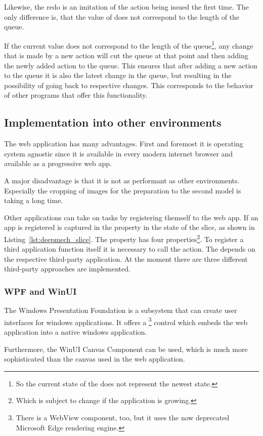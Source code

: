 Likewise, the redo is an imitation of the action being issued the first time.
The only difference is, that the value of  does not correspond to the length of the queue.

If the current  value does not correspond to the length of the queue\footnote{So the current state of the  does not represent the newest state.}, any change that is made by a new action will cut the queue at that point and then adding the newly added action to the queue.
This ensures that after adding a new action to the queue it is also the latest change in the queue, but resulting in the possibility of going back to respective changes.
This corresponds to the behavior of other programs that offer this functionality.


\subsection{Implementation into other environments}

The web application has many advantages.
First and foremost it is operating system agnostic since it is available in every modern internet browser and available as a progressive web app. %

A major disadvantage is that it is not as performant as other environments.
Especially the cropping of images for the preparation to the second model is taking a long time.

Other applications can take on tasks by registering themself to the web app.
If an app is registered is captured in the  property in the state of the  slice, as shown in Listing~\ref{lst:deepmech_slice}.
The  property has four properties\footnote{Which is subject to change if the application is growing.}.
To register a third application function itself it is necessary to call the  action.
The  depends on the respective third-party application.
At the moment there are three different third-party approaches are implemented.

\subsubsection{WPF and WinUI}

The Windows Presentation Foundation is a subsystem that can create user interfaces for windows applications.
It offers a \footnote{There is a WebView component, too, but it uses the now deprecated Microsoft Edge rendering engine.} control which embeds the web application into a native windows application. %



Furthermore, the WinUI Canvas Component can be used, which is much more sophisticated than the canvas used in the web application.
